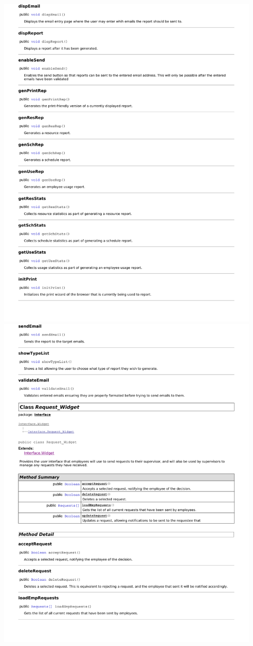 \documentclass[letterpaper,12pt]{report}
\begin{document}
\newpage
\includegraphics[scale=0.9,trim=20mm 30mm 25mm 5mm]{externals/di8.pdf}
\newpage
\includegraphics[scale=0.9,trim=20mm 30mm 25mm 5mm]{externals/di9.pdf}
\end{document}

